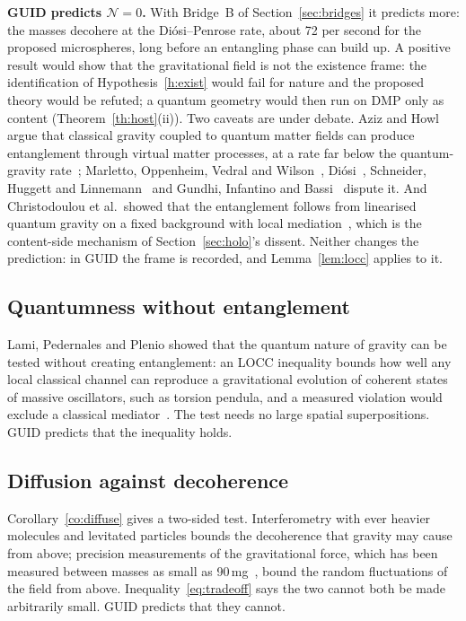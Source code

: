 \documentclass[11pt,a4paper]{article}
\theoremstyle{definition}
\theoremstyle{remark}
\theoremstyle{definition}
\begin{document}
\textbf{GUID predicts $\mathcal N=0$.} With Bridge~B of Section~\ref{sec:bridges} it predicts more: the masses decohere at the
Di\'osi--Penrose rate, about 72 per second for the proposed microspheres, long before an entangling phase can build up. A positive result would show that the gravitational field is not the existence frame: the identification
of Hypothesis~\ref{h:exist} would fail for nature and the proposed theory would be refuted; a quantum geometry would then run on DMP only
as content (Theorem~\ref{th:host}(ii)). Two caveats are
under debate. Aziz and Howl argue that classical gravity coupled to quantum matter fields can produce entanglement through virtual matter
processes, at a rate far below the quantum-gravity rate~\cite{azizhowl}; Marletto, Oppenheim, Vedral and Wilson~\cite{movw},
Di\'osi~\cite{diosi25}, Schneider, Huggett and Linnemann~\cite{shl} and Gundhi, Infantino and Bassi~\cite{gib} dispute it. And
Christodoulou et al.\ showed that the entanglement follows from linearised quantum gravity on a fixed background with local
mediation~\cite{christodoulou23}, which is the content-side mechanism of Section~\ref{sec:holo}'s dissent. Neither changes the prediction:
in GUID the frame is recorded, and Lemma~\ref{lem:locc} applies to it.

\subsection{Quantumness without entanglement}

Lami, Pedernales and Plenio showed that the quantum nature of gravity can be tested without creating entanglement: an LOCC inequality bounds
how well any local classical channel can reproduce a gravitational evolution of coherent states of massive oscillators, such as torsion
pendula, and a measured violation would exclude a classical mediator~\cite{lpp}. The test needs no large spatial superpositions. GUID
predicts that the inequality holds.

\subsection{Diffusion against decoherence}

Corollary~\ref{co:diffuse} gives a two-sided test. Interferometry with ever heavier molecules and levitated particles bounds the decoherence
that gravity may cause from above; precision measurements of the gravitational force, which has been measured between masses as small as
90\,mg~\cite{westphal}, bound the random fluctuations of the field from above. Inequality~\eqref{eq:tradeoff} says the two cannot both be
made arbitrarily small. GUID predicts that they cannot.
\end{document}
